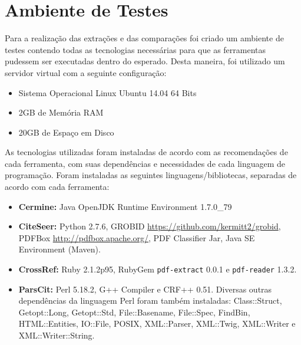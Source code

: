 \section{Ambiente de Testes}

Para a realização das extrações e das comparações foi criado um ambiente de testes contendo todas as tecnologias necessárias para que as ferramentas pudessem ser executadas dentro do esperado. Desta maneira, foi utilizado um servidor virtual com a seguinte configuração:

\begin{itemize}
    \item Sistema Operacional Linux Ubuntu 14.04 64 Bits
    \item 2GB de Memória RAM
    \item 20GB de Espaço em Disco
\end{itemize}

As tecnologias utilizadas foram instaladas de acordo com as recomendações de cada ferramenta, com suas dependências e necessidades de cada linguagem de programação. Foram instaladas as seguintes linguagens/bibliotecas, separadas de acordo com cada ferramenta:

\begin{itemize}
    \item \textbf{Cermine:} Java OpenJDK Runtime Environment 1.7.0\_79
    \item \textbf{CiteSeer:} Python 2.7.6, GROBID \url{https://github.com/kermitt2/grobid}, PDFBox \url{http://pdfbox.apache.org/}, PDF Classifier Jar, Java SE Environment (Maven). 
    \item \textbf{CrossRef:} Ruby 2.1.2p95, RubyGem \texttt{pdf-extract} 0.0.1 e \texttt{pdf-reader} 1.3.2.
    \item \textbf{ParsCit:} Perl 5.18.2, G++ Compiler e CRF++ 0.51. Diversas outras dependências da linguagem Perl foram também instaladas: Class::Struct, Getopt::Long, Getopt::Std, File::Basename, File::Spec, FindBin, HTML::Entities, IO::File, POSIX, XML::Parser, XML::Twig, XML::Writer e XML::Writer::String.
\end{itemize}

